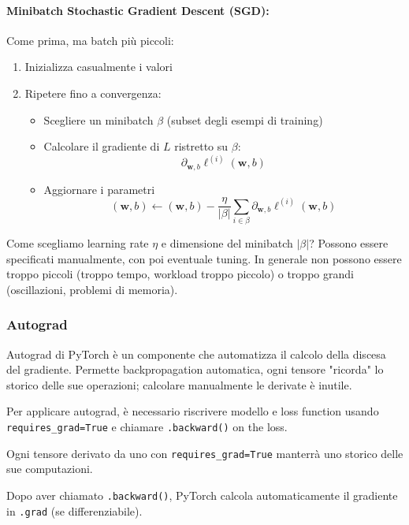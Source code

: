 \paragraph{Minibatch Stochastic Gradient Descent (SGD):} Come prima, ma batch più piccoli: 
\begin{enumerate}
    \item Inizializza casualmente i valori
    
    \item Ripetere fino a convergenza:
    \begin{itemize}
        \item Scegliere un minibatch $\beta$ (subset degli esempi di training)
        
        \item Calcolare il gradiente di $L$ ristretto su $\beta$:
        $$ \partial_{\bm w, b} \ell^{(i)} (\bm w, b) $$
        
        \item Aggiornare i parametri 
        $$ (\bm w, b) \leftarrow (\bm w, b) - \frac{\eta}{|\beta|} \sum_{i \in \beta} \partial_{\bm w, b} \ell^{(i)} (\bm w, b) $$
    \end{itemize}
\end{enumerate}

Come scegliamo learning rate $\eta$ e dimensione del minibatch $|\beta|$? Possono essere specificati manualmente, con poi eventuale tuning. In generale non possono essere troppo piccoli (troppo tempo, workload troppo piccolo) o troppo grandi (oscillazioni, problemi di memoria).

\subsubsection{Autograd}

Autograd di PyTorch è un componente che automatizza il calcolo della discesa del gradiente. Permette backpropagation automatica, ogni tensore "ricorda" lo storico delle sue operazioni; calcolare manualmente le derivate è inutile.

Per applicare autograd, è necessario riscrivere modello e loss function usando \texttt{requires\_grad=True} e chiamare \texttt{.backward()} on the loss.

Ogni tensore derivato da uno con \texttt{requires\_grad=True} manterrà uno storico delle sue computazioni. 

Dopo aver chiamato \texttt{.backward()}, PyTorch calcola automaticamente il gradiente in \texttt{.grad} (se differenziabile). 

